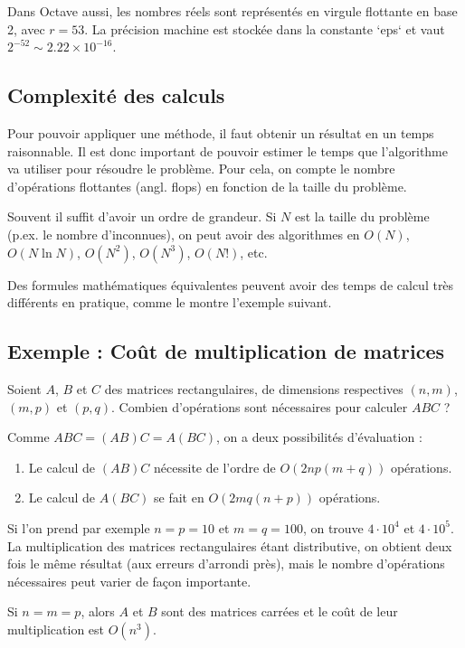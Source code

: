 Dans Octave aussi, les nombres réels sont représentés en virgule flottante en base 2, avec $r = 53$. La précision machine est stockée dans la constante `eps` et vaut $2^{-52} \sim 2.22 \times 10^{-16}$.


\subsection{Complexité des calculs}
Pour pouvoir appliquer une méthode, il faut obtenir un résultat en un temps raisonnable. Il est donc important de pouvoir estimer le temps que l’algorithme va utiliser pour résoudre le problème. Pour cela, on compte le nombre d’opérations flottantes (angl. flops) en fonction de la taille du problème.

Souvent il suffit d’avoir un ordre de grandeur. Si $N$ est la taille du problème (p.ex. le nombre d’inconnues), on peut avoir des algorithmes en $O(N)$, $O(N \ln N)$, $O(N^2)$, $O(N^3)$, $O(N!)$, etc.

Des formules mathématiques équivalentes peuvent avoir des temps de calcul très différents en pratique, comme le montre l’exemple suivant.

\subsection{ Exemple : Coût de multiplication de matrices}
Soient $A$, $B$ et $C$ des matrices rectangulaires, de dimensions respectives $(n, m)$, $(m, p)$ et $(p, q)$. Combien d’opérations sont nécessaires pour calculer $ABC$ ?

Comme $ABC = (AB)C = A(BC)$, on a deux possibilités d’évaluation :

\begin{enumerate}
\item Le calcul de $(AB)C$ nécessite de l’ordre de $O(2np(m +q))$ opérations.
\item Le calcul de $A(BC)$ se fait en $O(2mq(n + p))$ opérations.
\end{enumerate}

Si l’on prend par exemple $n = p = 10$ et $m = q = 100$, on trouve $4 \cdot 10^4$ et $4 \cdot 10^5$. La multiplication des matrices rectangulaires étant distributive, on obtient deux fois le même résultat (aux erreurs d'arrondi près), mais le nombre d’opérations nécessaires peut varier de façon importante.

Si $n = m = p$, alors $A$ et $B$ sont des matrices carrées et le coût de leur multiplication est $O(n^3)$.


